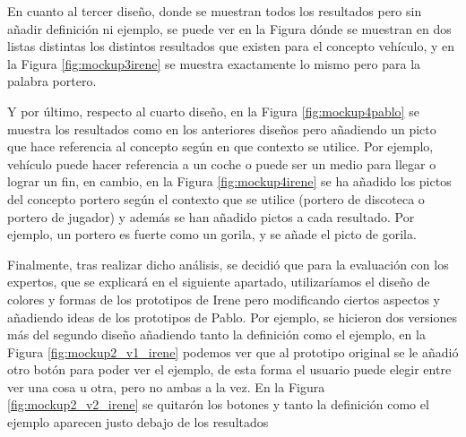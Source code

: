 En cuanto al tercer diseño, donde se muestran todos los resultados pero sin añadir definición ni ejemplo, se puede ver en la Figura  dónde se muestran en dos listas distintas los distintos resultados que existen para el concepto vehículo, y en la Figura \ref{fig:mockup3irene} se muestra exactamente lo mismo pero para la palabra portero. 

Y por último, respecto al cuarto diseño, en la Figura \ref{fig:mockup4pablo} se muestra los resultados como en los anteriores diseños pero añadiendo un picto que hace referencia al concepto según en que contexto se utilice. Por ejemplo, vehículo puede hacer referencia a un coche o puede ser un medio para llegar o lograr un fin, en cambio, en la Figura \ref{fig:mockup4irene} se ha añadido los pictos del concepto portero según el contexto que se utilice (portero de discoteca o portero de jugador) y además se han añadido pictos a cada resultado. Por ejemplo, un portero es fuerte como un gorila, y se añade el picto de gorila.

Finalmente, tras realizar dicho análisis, se decidió que para la evaluación con los expertos, que se explicará en el siguiente apartado, utilizaríamos el diseño de colores y formas de los prototipos de Irene pero modificando ciertos aspectos y añadiendo ideas de los prototipos de Pablo. Por ejemplo, se hicieron dos versiones más del segundo diseño añadiendo tanto la definición como el ejemplo, en la Figura \ref{fig:mockup2_v1_irene} podemos ver que al prototipo original se le añadió otro botón para poder ver el ejemplo, de esta forma el usuario puede elegir entre ver una cosa u otra, pero no ambas a la vez. En la Figura \ref{fig:mockup2_v2_irene} se quitarón los botones y tanto la definición como el ejemplo aparecen justo debajo de los resultados




	
